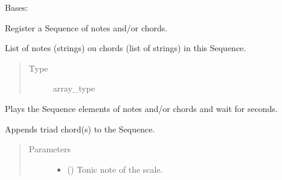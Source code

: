 \documentclass[letterpaper,10pt,english]{sphinxmanual}
\begin{document}
\begin{fulllineitems}
\label{\detokenize{index:birdears.sequence.Sequence}}
Bases: 

Register a Sequence of notes and/or chords.

\begin{fulllineitems}
\label{\detokenize{index:birdears.sequence.Sequence.elements}}
List of notes (strings) ou chords (list of
strings) in this Sequence.
\begin{quote}\begin{description}
\item[{Type}] \leavevmode
array\_type

\end{description}\end{quote}

\end{fulllineitems}


\begin{fulllineitems}
\label{\detokenize{index:birdears.sequence.Sequence.async_play}}
Plays the Sequence elements of notes and/or chords and wait for
 seconds.

\end{fulllineitems}


\begin{fulllineitems}
\label{\detokenize{index:birdears.sequence.Sequence.make_chord_progression}}
Appends triad chord(s) to the Sequence.
\begin{quote}\begin{description}
\item[{Parameters}] \leavevmode\begin{itemize}
\item {} 
 () \textendash{} Tonic note of the scale.


\end{itemize}
\end{description}
\end{quote}
\end{fulllineitems}
\end{fulllineitems}
\end{document}
